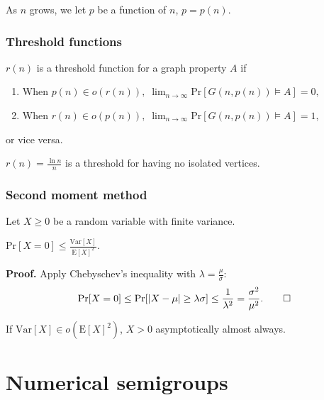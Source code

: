\documentclass{beamer}
\def\Pr{\ensuremath{\mathrm{Pr}}}
\def\Var{\ensuremath{\mathrm{Var}}}
\def\EE{\ensuremath{\mathrm{E}}}
\begin{document}

\begin{frame}
As $n$ grows, we let $p$ be a function of $n$, $p = p(n)$. \par
\frametitle{Threshold functions}
\begin{definition}\label{def:probmet:threshold}
    $r(n)$ is a threshold function for a graph property $A$ if 
    \begin{enumerate}
        \item When \(p(n) \in o(r(n)), \; \lim_{n \to \infty} \Pr[G(n, p(n)) \vDash A] = 0,\)
        \item When \(r(n) \in o(p(n)), \;  \lim_{n \to \infty} \Pr[G(n, p(n)) \vDash A] = 1,\) 
    \end{enumerate}
    or vice versa.
\end{definition}
\begin{example}
    $\displaystyle{r(n) = \frac{\ln n}{n}}$ is a threshold for having no isolated vertices. 
\end{example}
\end{frame}



\begin{frame}
    \frametitle{Second moment method}
    Let $X \geq 0$ be a random variable with finite variance. 
    \begin{theorem}\label{thm:probmet:secondmoment:1}
        \(\Pr[X = 0] \leq \frac{\Var[X]}{\EE[X]^2}.\)
    \end{theorem}
    \textbf{Proof.} Apply Chebyschev's inequality with $\lambda = \frac{\mu}{\sigma}$:
    \[\Pr[X = 0] \leq \Pr[|X - \mu| \geq \lambda \sigma] \leq \frac{1}{\lambda^2} = \frac{\sigma^2}{\mu^2}. \qed \]
    \begin{corollary}\label{cor:probmet:secondmoment:1}
        If $\Var[X] \in o(\EE[X]^2)$, $X > 0$ asymptotically almost always. 
    \end{corollary}
    
\end{frame}


\section{Numerical semigroups}
\end{document}
